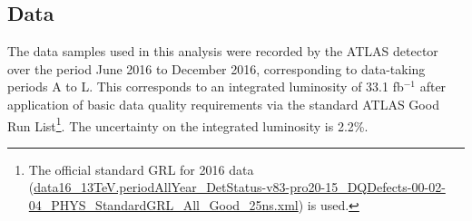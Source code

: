\subsection{Data}

The data samples used in this analysis were recorded by the ATLAS detector over the period June 2016 to December 2016, corresponding to data-taking periods A to L. This corresponds to an integrated luminosity of 33.1 fb${}^{-1}$ after application of basic data quality requirements via the standard ATLAS Good Run List\footnote{The official standard GRL for 2016 data (\url{data16_13TeV.periodAllYear_DetStatus-v83-pro20-15_DQDefects-00-02-04_PHYS_StandardGRL_All_Good_25ns.xml}) is used.}. The uncertainty on the integrated luminosity is 2.2\%. 

